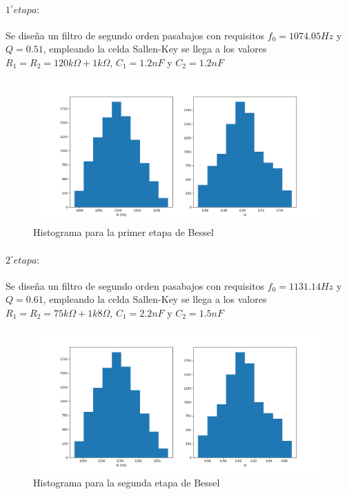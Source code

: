 \paragraph{$1^{\circ} etapa:$} Se dise\~na un filtro de segundo orden pasabajos con requisitos $f_0 = 1074.05Hz$ y $Q = 0.51$, empleando la celda Sallen-Key se llega a los valores $R_1 = R_2 = 120k \Omega + 1k\Omega$, $C_1 = 1.2nF$ y $C_2 = 1.2nF$

\begin{figure}[H]
    \centering
    \includegraphics[scale=0.4]{../EJ1/Recursos/bessel_histogram_one.png}
    \caption{Histograma para la primer etapa de Bessel}
    \label{fig:bessel_histogram_one}
\end{figure}

\paragraph{$2^{\circ} etapa:$} Se dise\~na un filtro de segundo orden pasabajos con requisitos $f_0 = 1131.14Hz$ y $Q = 0.61$, empleando la celda Sallen-Key se llega a los valores $R_1 = R_2 = 75k \Omega + 1k8\Omega$, $C_1 = 2.2nF$ y $C_2 = 1.5nF$

\begin{figure}[H]
    \centering
    \includegraphics[scale=0.4]{../EJ1/Recursos/bessel_histogram_two.png}
    \caption{Histograma para la segunda etapa de Bessel}
    \label{fig:bessel_histogram_two}
\end{figure}

